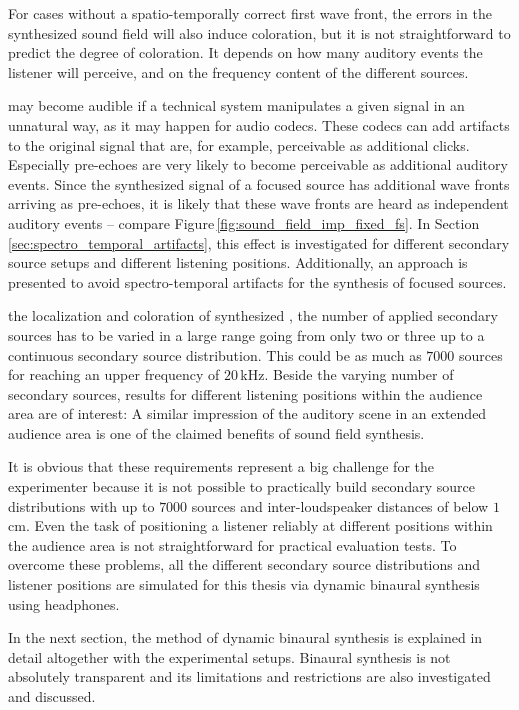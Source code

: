 For cases without a spatio-temporally correct first wave front, the errors in the
synthesized sound field will also induce coloration, but it
is not straightforward to predict the degree of coloration. It depends on how many auditory events
the listener will perceive, and on the frequency content of the different
sources.


 may become audible if a technical system
manipulates a given signal in an unnatural way, as it may happen for
audio codecs. These codecs can add artifacts to the original signal
that are, for example, perceivable as additional clicks.
Especially pre-echoes are very likely to become
perceivable as additional auditory events. Since the synthesized signal of a
focused source has additional wave fronts arriving as pre-echoes, it is likely
that these wave fronts are heard as independent auditory events -- compare
Figure\,\ref{fig:sound_field_imp_fixed_fs}.
In Section\,\ref{sec:spectro_temporal_artifacts}, this effect is investigated for
different secondary source setups and different listening positions.
Additionally, an approach is presented to avoid spectro-temporal artifacts
for the synthesis of focused sources.

 the localization and coloration of synthesized
, the
number of applied secondary sources has to be varied in a large range going
from only two or three up to a continuous secondary source distribution.
This could be as much as $7000$ sources for reaching an upper frequency of $20$\,kHz.
Beside the varying number of secondary sources, results for different listening positions
within the audience area are of interest: A similar impression of the
auditory scene in an extended audience area is one of the claimed benefits of
sound field synthesis.

It is obvious that these requirements represent a big challenge for the experimenter
because it is not possible to practically build secondary source distributions with up to
$7000$ sources and inter-loudspeaker distances of below $1$\,cm. Even the task of
positioning a listener reliably at different positions within the audience area
is not straightforward for practical evaluation tests.
To overcome these problems, all the
different secondary source distributions and listener positions are simulated
for this thesis
via dynamic binaural synthesis using headphones.

In the next section, the method of dynamic binaural synthesis is explained in
detail altogether with the experimental setups. Binaural synthesis is not
absolutely transparent and its limitations and restrictions are also
investigated and discussed.
